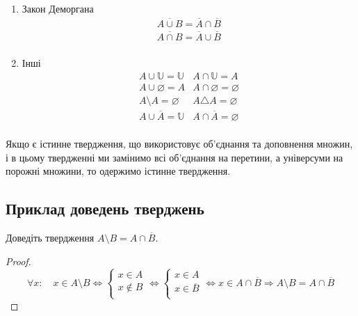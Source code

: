 \begin{multicols}{2}
\begin{enumerate}
        \item Закон Деморгана
            \begin{gather*}
                \overline{A \cup B} = \overline{A} \cap \overline{B}\\
                \overline{A \cap B} = \overline{A} \cup \overline{B}\\
            \end{gather*}
        
        \item Інші
        $$\begin{array}{cc}
            A \cup \mathbb{U} = \mathbb{U} & A \cap \mathbb{U} = A \\
            A \cup \varnothing = A & A \cap \varnothing = \varnothing \\
            A \setminus A = \varnothing & A \triangle A = \varnothing \\
            A \cup \overline{A} = \mathbb{U} & A \cap \overline{A} = \varnothing \\
        \end{array}$$
    \end{enumerate}
\end{multicols}

\begin{claim}
    Якщо є істинне твердження, що використовує об'єд\-нання та доповнення множин, і в цьому твердженні ми замінимо всі об'єднання на перетини, а універсуми на порожні множини, то одержимо істинне твердження.
\end{claim}

\subsection*{Приклад доведень тверджень}

\begin{example}
    Доведіть твердження $A \setminus B = A \cap \overline{B}$.
    \begin{proof}
        \begin{equation*}
            \forall x: \quad x \in A \setminus B \Leftrightarrow \left\{ \begin{array}{c}
                x \in A \\
                x \not\in B \\
            \end{array} \right. \Leftrightarrow \left\{ \begin{array}{c}
                x \in A \\
                x \in \overline{B}\\
            \end{array} \right. \Leftrightarrow x \in A \cap \overline{B} \Rightarrow
            A \setminus B = A \cap \overline{B}
        \end{equation*}
    \end{proof}
\end{example}

